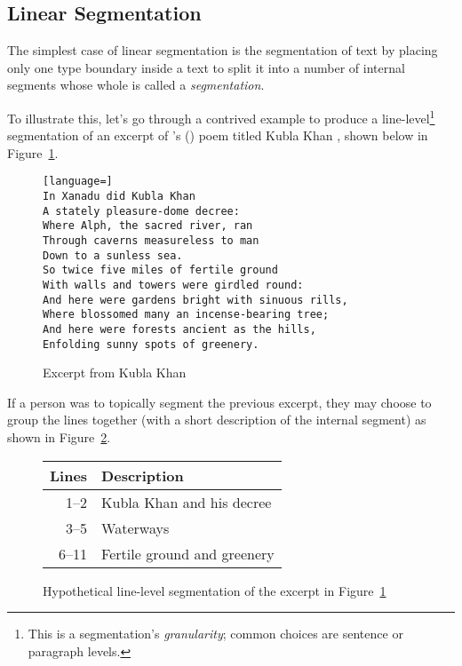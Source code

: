 \documentclass{article}
\def\citeapos#1{\citeauthor{#1}'s (\citeyear{#1})}
\begin{document}
\subsection{Linear Segmentation}
The simplest case of linear segmentation is the segmentation of text by placing
only one type boundary inside a text to split it into a number of internal
segments whose whole is called a \emph{segmentation}.

To illustrate this, let's go through a contrived example to produce a
line-level\footnote{This is a segmentation's \emph{granularity}; common choices
are sentence or paragraph levels.} segmentation of an excerpt of
\citeapos{Coleridge1816} poem titled Kubla Khan \citep[pp.
55--58]{Coleridge1816}, shown below in Figure~\ref{fig:linear:text:kublakhan}.

\begin{figure}[h]
\begin{lstlisting}[language=]
In Xanadu did Kubla Khan
A stately pleasure-dome decree:
Where Alph, the sacred river, ran
Through caverns measureless to man
Down to a sunless sea.
So twice five miles of fertile ground
With walls and towers were girdled round:
And here were gardens bright with sinuous rills,
Where blossomed many an incense-bearing tree;
And here were forests ancient as the hills,
Enfolding sunny spots of greenery.
\end{lstlisting}
\vspace{-3em}
\caption{Excerpt from Kubla Khan \citep[pp. 55--58]{Coleridge1816}}
\label{fig:linear:text:kublakhan}
\end{figure}

If a person was to topically segment the previous excerpt, they may choose
to group the lines together (with a short description of the internal segment)
as shown in Figure~\ref{fig:linear:segmentation:kublakhan}.

\begin{figure}[h]
\centering
\begin{tabular}{ r l }
\textbf{Lines}  & \textbf{Description} \\ \hline \hline
1--2  & Kubla Khan and his decree \\
3--5  & Waterways \\
6--11 & Fertile ground and greenery \\
\end{tabular}
\caption{Hypothetical line-level segmentation of the excerpt in Figure~\ref{fig:linear:text:kublakhan}}
\label{fig:linear:segmentation:kublakhan}
\end{figure}
\end{document}
